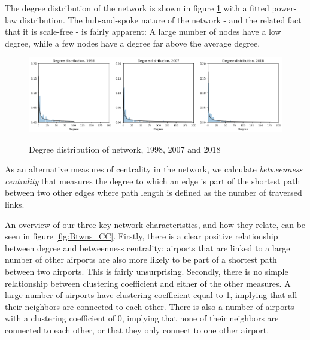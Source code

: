 \noindent
The degree distribution of the network is shown in figure \ref{fig:degree_distribution} with a fitted power-law distribution. The hub-and-spoke nature of the network - and the related fact that it is scale-free - is fairly apparent: A large number of nodes have a low degree, while a few nodes have a degree far above the average degree. 
\begin{figure}[H]
  \centering
  \caption{Degree distribution of network, 1998, 2007 and 2018}
    \includegraphics[width=1 \textwidth]{Exam/Figures/degree_distributionv2.png}
  \label{fig:degree_distribution}
\end{figure}
\noindent
As an alternative measures of centrality in the network, we calculate \textit{betweenness centrality} that measures the degree to which an edge is part of the shortest path between two other edges where path length is defined as the number of traversed links.
\par
An overview of our three key network characteristics, and how they relate, can be seen in figure \ref{fig:Btwns_CC}. Firstly, there is a clear positive relationship between degree and betweenness centrality; airports that are linked to a large number of other airports are also more likely to be part of a shortest path between two airports. This is fairly unsurprising. Secondly, there is no simple relationship between clustering coefficient and either of the other measures. A large number of airports have clustering coefficient equal to 1, implying that all their neighbors are connected to each other. There is also a number of airports with a clustering coefficient of 0, implying that none of their neighbors are connected to each other, or that they only connect to one other airport. 
